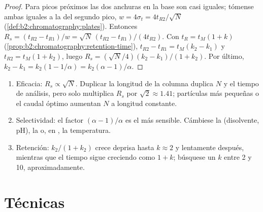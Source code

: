 \begin{proof}
Para picos próximos las dos anchuras en la base son casi iguales; tómense ambas iguales a la del segundo pico,
$w = 4\sigma_t = 4t_{R2}/\sqrt N$ (\cref{def:b2:chromatography:plates}). Entonces $R_s = (t_{R2} -
t_{R1})/w = \sqrt N\,(t_{R2} - t_{R1})/(4t_{R2})$. Con $t_R = t_M(1 + k)$
(\cref{prop:b2:chromatography:retention-time}), $t_{R2} - t_{R1} = t_M(k_2 - k_1)$ y $t_{R2} =
t_M(1 + k_2)$, luego $R_s = (\sqrt N/4)(k_2 - k_1)/(1 + k_2)$. Por último, $k_2 - k_1 = k_2(1 - 1/\alpha) =
k_2(\alpha - 1)/\alpha$.
\end{proof}

\begin{method}\label{met:b2:chromatography:improve-resolution}
\begin{enumerate}
  \item Eficacia: $R_s \propto \sqrt N$. Duplicar la longitud de la columna duplica $N$ y el tiempo de análisis,
        pero solo multiplica $R_s$ por $\sqrt2 \approx 1.41$; partículas más pequeñas o el caudal óptimo
        aumentan $N$ a longitud constante.
  \item Selectividad: el factor $(\alpha - 1)/\alpha$ es el más sensible. Cámbiese la 
        (disolvente, pH), la  o, en , la temperatura.
  \item Retención: $k_2/(1+k_2)$ crece deprisa hasta $k \approx 2$ y lentamente después, mientras que el tiempo
        sigue creciendo como $1 + k$; búsquese un $k$ entre 2 y 10, aproximadamente.
\end{enumerate}
\end{method}

\section{Técnicas}

